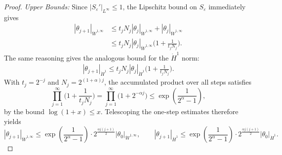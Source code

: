 \documentclass[12pt]{report}   %
\renewcommand{\le}{\leqslant}
\renewcommand{\epsilon}{\varepsilon}
\numberwithin{equation}{section}
\theoremstyle{plain}
\theoremstyle{definition}
\theoremstyle{remark}
\begin{document}
\begin{proof}
\emph{Upper Bounds:}
Since $|S_\epsilon'|_{L^\infty} \le 1$, the Lipschitz bound on $S_\epsilon$ immediately gives
\begin{align*}
|\theta _{j+1}|_{\dot{W}^{1,\infty}} &\le t_j N_j |\theta _j|_{\dot{W}^{1,\infty}}+|\theta _j|_{\dot{W}^{1,\infty}}\\
&\le t_j N_j |\theta _j|_{\dot{W}^{1,\infty}}\Big(1+\frac{1}{t_j N_j}\Big).
\end{align*}
The same reasoning gives the analogous bound for the $\dot{H}^1$ norm:
 \begin{equation*}
\begin{split}
|\theta _{j+1}|_{\dot{H}^{1}}\le t_j N_j |\theta _j|_{\dot{H}^{1}}\Big(1+\frac{1}{t_j N_j}\Big).
\end{split}
\end{equation*}
With $t_j=2^{-j}$ and $N_j=2^{(1+\alpha)j}$, the accumulated product over all steps satisfies
\[\prod_{j=1}^{\infty} \Big(1+\frac{1}{t_j N_j}\Big)=\prod_{j=1}^\infty \Big(1+2^{-{\alpha}j}\Big)\le {\exp\left(\frac{1}{2^\alpha-1}\right)}, \]
by the bound $\log(1+x)\le x$. Telescoping the one-step estimates therefore yields
\[|\theta _{j+1}|_{\dot{W}^{1,\infty}}\le  {\exp\left(\frac{1}{2^\alpha-1}\right)} \cdot 2^{\frac{{\alpha}j(j+1)}{2}} {|\theta_0|_{\dot{W}^{1,\infty}}}, \qquad
|\theta _{j+1}|_{\dot{H}^{1}}\le  {\exp\left(\frac{1}{2^\alpha-1}\right)} \cdot 2^{\frac{{\alpha}j(j+1)}{2}} |\theta_0|_{\dot{H}^{1}}. \]
\medskip


\end{proof}
\end{document}
